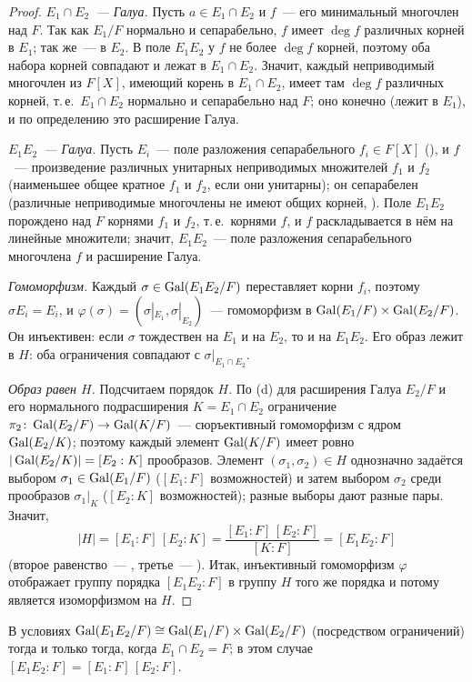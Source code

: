 \begin{proof}
\emph{$E_1\cap E_2$~--- Галуа.} Пусть $a\in E_1\cap E_2$ и $f$~--- его минимальный многочлен над $F$. Так как $E_1/F$ нормально и
сепарабельно, $f$ имеет $\deg f$ различных корней в $E_1$; так же~--- в $E_2$. В поле $E_1E_2$ у $f$ не более $\deg f$
корней, поэтому оба набора корней совпадают и лежат в $E_1\cap E_2$. Значит, каждый неприводимый многочлен из $F[X]$,
имеющий корень в $E_1\cap E_2$, имеет там $\deg f$ различных корней, т.\,е.\ $E_1\cap E_2$ нормально и сепарабельно над $F$;
оно конечно (лежит в $E_1$), и по определению это расширение Галуа.

\emph{$E_1E_2$~--- Галуа.} Пусть $E_i$~--- поле разложения сепарабельного $f_i\in F[X]$ (), и $f$~--- произведение
различных унитарных неприводимых множителей $f_1$ и $f_2$ (наименьшее общее кратное $f_1$ и $f_2$, если они унитарны); он сепарабелен (различные неприводимые многочлены не имеют
общих корней, ). Поле $E_1E_2$ порождено над $F$ корнями $f_1$ и $f_2$, т.\,е.\ корнями $f$, и $f$ раскладывается
в нём на линейные множители; значит, $E_1E_2$~--- поле разложения сепарабельного многочлена $f$ и расширение Галуа.

\emph{Гомоморфизм.} Каждый $\sigma\in\operatorname{Gal}(E_1E_2/F)$ переставляет корни $f_i$, поэтому $\sigma E_i=E_i$, и
$\varphi(\sigma)=(\sigma|_{E_1},\sigma|_{E_2})$~--- гомоморфизм в $\operatorname{Gal}(E_1/F)\times\operatorname{Gal}(E_2/F)$. Он инъективен: если $\sigma$
тождествен на $E_1$ и на $E_2$, то и на $E_1E_2$. Его образ лежит в $H$: оба ограничения совпадают с $\sigma|_{E_1\cap E_2}$.

\emph{Образ равен $H$.} Подсчитаем порядок $H$. По (d) для расширения Галуа $E_2/F$ и его нормального подрасширения
$K=E_1\cap E_2$ ограничение $\pi_2\colon\operatorname{Gal}(E_2/F)\to\operatorname{Gal}(K/F)$~--- сюръективный гомоморфизм с ядром $\operatorname{Gal}(E_2/K)$; поэтому
каждый элемент $\operatorname{Gal}(K/F)$ имеет ровно $|\operatorname{Gal}(E_2/K)|=[E_2:K]$ прообразов. Элемент $(\sigma_1,\sigma_2)\in H$ однозначно
задаётся выбором $\sigma_1\in\operatorname{Gal}(E_1/F)$ ($[E_1:F]$ возможностей) и затем выбором $\sigma_2$ среди прообразов
$\sigma_1|_K$ ($[E_2:K]$ возможностей); разные выборы дают разные пары. Значит,
\[
|H|=[E_1:F]\,[E_2:K]=\frac{[E_1:F]\,[E_2:F]}{[K:F]}=[E_1E_2:F]
\]
(второе равенство~--- , третье~--- ). Итак, инъективный гомоморфизм $\varphi$ отображает группу порядка
$[E_1E_2:F]$ в группу $H$ того же порядка и потому является изоморфизмом на $H$.
\end{proof}

\begin{corollary}[3.21a]
В условиях  $\operatorname{Gal}(E_1E_2/F)\cong\operatorname{Gal}(E_1/F)\times\operatorname{Gal}(E_2/F)$ (посредством ограничений) тогда и только тогда, когда
$E_1\cap E_2=F$; в этом случае $[E_1E_2:F]=[E_1:F]\,[E_2:F]$.
\end{corollary}

